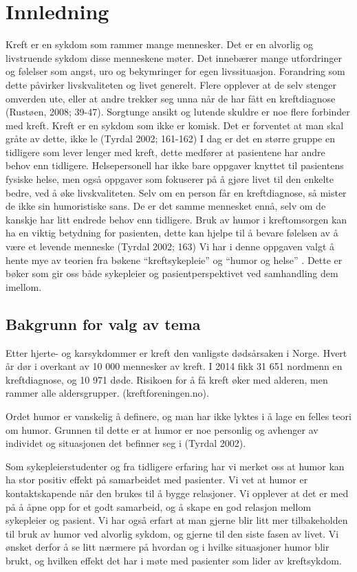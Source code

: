 \chapter{Innledning}

Kreft er en sykdom som rammer mange mennesker. Det er en alvorlig og
livstruende sykdom disse menneskene møter. Det innebærer mange utfordringer og
følelser som angst, uro og bekymringer for egen livssituasjon. Forandring som
dette påvirker livskvaliteten og livet generelt. Flere opplever at de selv
stenger omverden ute, eller at andre trekker seg unna når de har fått en
kreftdiagnose (Rustøen, 2008; 39-47). Sorgtunge ansikt og lutende skuldre er
noe flere forbinder med kreft. Kreft er en sykdom som ikke er komisk. Det er
forventet at man skal gråte av dette, ikke le (Tyrdal 2002; 161-162) I dag er
det en større gruppe en tidligere som lever lenger med kreft, dette medfører at
pasientene har andre behov enn tidligere. Helsepersonell har ikke bare oppgaver
knyttet til pasientens fysiske helse, men også oppgaver som fokuserer på å
gjøre livet til den enkelte bedre, ved å øke livskvaliteten. Selv om en person
får en kreftdiagnose, så mister de ikke sin humoristiske sans. De er det samme
mennesket ennå, selv om de kanskje har litt endrede behov enn tidligere. Bruk
av humor i kreftomsorgen kan ha en viktig betydning for pasienten, dette kan
hjelpe til å bevare følelsen av å være et levende menneske (Tyrdal 2002; 163)
Vi har i denne oppgaven valgt å hente mye av teorien fra bøkene
“kreftsykepleie” og “humor og helse” . Dette er bøker som gir oss både
sykepleier og pasientperspektivet ved samhandling dem imellom.

\section{Bakgrunn for valg av tema}

Etter hjerte- og karsykdommer er kreft den vanligste dødsårsaken i Norge. Hvert
år dør i overkant av 10 000 mennesker av kreft. I 2014 fikk 31 651 nordmenn en
kreftdiagnose, og 10 971 døde. Risikoen for å få kreft øker med alderen, men
rammer alle aldersgrupper. (kreftforeningen.no).

Ordet humor er vanskelig å definere, og man har ikke lyktes i å lage en felles
teori om humor. Grunnen til dette er at humor er noe personlig og avhenger av
individet og situasjonen det befinner seg i (Tyrdal 2002). 

Som sykepleierstudenter og fra tidligere erfaring har vi merket oss at humor
kan ha stor positiv effekt på samarbeidet med pasienter. Vi vet at humor er
kontaktskapende når den brukes til å bygge relasjoner. Vi opplever at det er
med på å åpne opp for et godt samarbeid, og å skape en god relasjon mellom
sykepleier og pasient. Vi har også erfart at man gjerne blir litt mer
tilbakeholden til bruk av humor ved alvorlig  sykdom, og gjerne til den siste
fasen av livet. Vi ønsket derfor å se litt nærmere på hvordan og i hvilke
situasjoner humor blir brukt, og hvilken effekt det har i møte med pasienter
som lider av kreftsykdom. 

